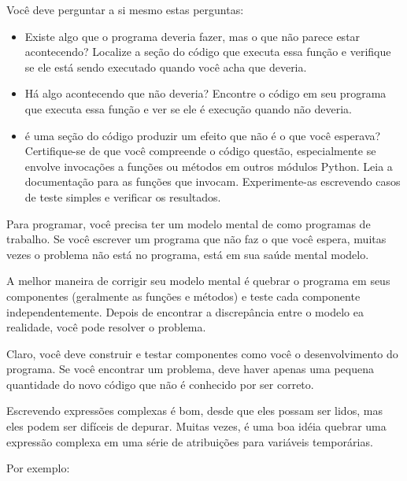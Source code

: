 \documentclass[10pt]{book}
\begin{document}
\begin{v erbatim}
Você deve perguntar a si mesmo estas perguntas:

\begin{itemize}

\item Existe algo que o programa deveria fazer, mas
o que não parece estar acontecendo? Localize a seção do código
que executa essa função e verifique se ele está sendo executado quando
você acha que deveria.

\item Há algo acontecendo que não deveria? Encontre o código em
seu programa que executa essa função e ver se ele é
execução quando não deveria.

\item é uma seção do código produzir um efeito que não é
o que você esperava? Certifique-se de que você compreende o código
questão, especialmente se envolve invocações a funções ou métodos em
outros módulos Python. Leia a documentação para as funções que invocam.
Experimente-as escrevendo casos de teste simples e verificar os resultados.

\end{itemize}

Para programar, você precisa ter um modelo mental de como
programas de trabalho. Se você escrever um programa que não faz o que você espera,
muitas vezes o problema não está no programa, está em sua saúde mental
modelo.

A melhor maneira de corrigir seu modelo mental é quebrar o programa
em seus componentes (geralmente as funções e métodos) e teste
cada componente independentemente. Depois de encontrar a discrepância
entre o modelo ea realidade, você pode resolver o problema.

Claro, você deve construir e testar componentes como você
o desenvolvimento do programa. Se você encontrar um problema,
deve haver apenas uma pequena quantidade do novo código
que não é conhecido por ser correto.



Escrevendo expressões complexas é bom, desde que eles possam ser lidos,
mas eles podem ser difíceis de depurar. Muitas vezes, é uma boa idéia
quebrar uma expressão complexa em uma série de atribuições para
variáveis ​​temporárias.

Por exemplo:


\end{v erbatim}
\end{document}
